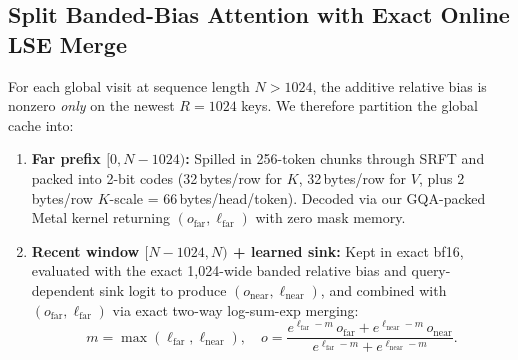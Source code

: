 \documentclass[conference]{IEEEtran}
\begin{document}
\subsection{Split Banded-Bias Attention with Exact Online LSE Merge}
For each global visit at sequence length $N > 1024$, the additive relative bias is nonzero \emph{only} on the newest $R=1024$ keys. We therefore partition the global cache into:
\begin{enumerate}
    \item \textbf{Far prefix $[0, N-1024)$:} Spilled in 256-token chunks through SRFT and packed into 2-bit codes (32\,bytes/row for $K$, 32\,bytes/row for $V$, plus 2\,bytes/row $K$-scale = 66\,bytes/head/token). Decoded via our GQA-packed Metal kernel returning $(o_{\mathrm{far}}, \ell_{\mathrm{far}})$ with zero mask memory.
    \item \textbf{Recent window $[N-1024, N)$ + learned sink:} Kept in exact bf16, evaluated with the exact 1{,}024-wide banded relative bias and query-dependent sink logit to produce $(o_{\mathrm{near}}, \ell_{\mathrm{near}})$, and combined with $(o_{\mathrm{far}}, \ell_{\mathrm{far}})$ via exact two-way log-sum-exp merging:
    \begin{equation}
        m = \max(\ell_{\mathrm{far}}, \ell_{\mathrm{near}}), \quad
        o = \frac{e^{\ell_{\mathrm{far}}-m}\,o_{\mathrm{far}} + e^{\ell_{\mathrm{near}}-m}\,o_{\mathrm{near}}}{e^{\ell_{\mathrm{far}}-m} + e^{\ell_{\mathrm{near}}-m}}.
    \end{equation}
\end{enumerate}
\end{document}
